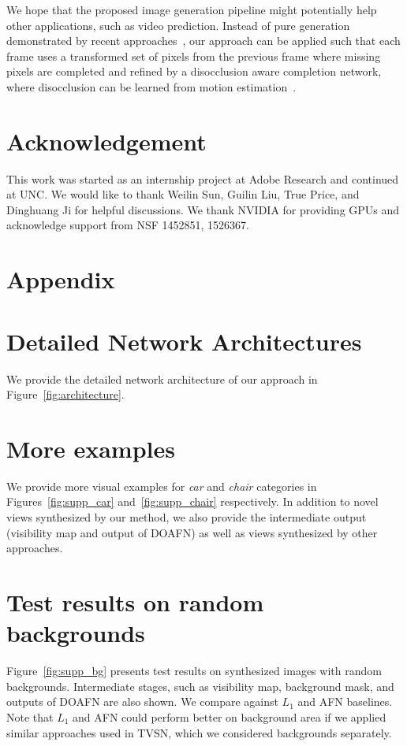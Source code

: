 \documentclass[10pt,twocolumn,letterpaper]{article}
\begin{document}
We hope that the proposed image generation pipeline might potentially help other applications, such as video prediction. Instead of pure generation demonstrated by recent approaches~\cite{mathieu_iclr2016,Vondrick_nips2016}, our approach can be applied such that each frame uses a transformed set of pixels from the previous frame\cite{walker_eccv2016,dfn_NIPS2016,finn_NIPS2016} where missing pixels are completed and refined by a disocclusion aware completion network, where disocclusion can be learned from motion estimation~\cite{walker_eccv2016,finn_NIPS2016}.

\section*{Acknowledgement}
This work was started as an internship project at Adobe Research and continued at UNC. We would like to thank Weilin Sun, Guilin Liu, True Price, and Dinghuang Ji for helpful discussions. We thank NVIDIA for providing GPUs and acknowledge support from NSF 1452851, 1526367.

{\small


}




\newpage
\clearpage
\appendix

\section*{Appendix}

\section{Detailed Network Architectures}
We provide the detailed network architecture of our approach in Figure~\ref{fig:architecture}.

\section{More examples}
We provide more visual examples for \emph{car} and \emph{chair} categories in Figures~\ref{fig:supp_car} and~\ref{fig:supp_chair} respectively. In addition to novel views synthesized by our method, we also provide the intermediate output (visibility map and output of DOAFN) as well as views synthesized by other approaches.

\section{Test results on random backgrounds}
Figure~\ref{fig:supp_bg} presents test results on synthesized images with random backgrounds. Intermediate stages, such as visibility map, background mask, and outputs of DOAFN are also shown. We compare against $L_1$ and AFN baselines. Note that $L_1$ and AFN could perform better on background area if we applied similar approaches used in TVSN, which we considered backgrounds separately.
\end{document}
